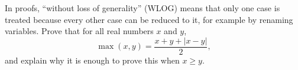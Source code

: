In proofs, ``without loss of generality'' (WLOG) means that only one case is treated because every other case can be reduced to it, for example by renaming variables. Prove that for all real numbers $x$ and $y$,
\[
\max(x,y)=\dfrac{x+y+|x-y|}{2},
\]
and explain why it is enough to prove this when $x\ge y$.
